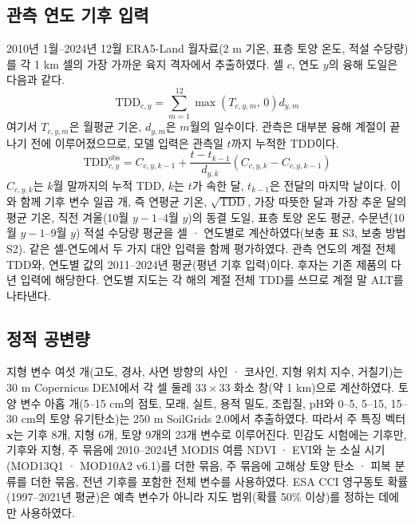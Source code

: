 \subsection{관측 연도 기후 입력}
2010년 1월--2024년 12월 ERA5-Land 월자료\cite{munozsabater2021_era5_land}(2 m 기온, 표층 토양 온도, 적설 수당량)를 각 1 km 셀의 가장 가까운 육지 격자에서 추출하였다. 셀 $c$, 연도 $y$의 융해 도일은 다음과 같다.
\begin{equation}
\mathrm{TDD}_{c,y} = \sum_{m=1}^{12} \max\!\left(T_{c,y,m},\,0\right) d_{y,m}
\label{eq:tdd}
\end{equation}
여기서 $T_{c,y,m}$은 월평균 기온, $d_{y,m}$은 $m$월의 일수이다. 관측은 대부분 융해 계절이 끝나기 전에 이루어졌으므로, 모델 입력은 관측일 $t$까지 누적한 TDD이다.
\begin{equation}
\mathrm{TDD}^{\mathrm{obs}}_{c,y} = C_{c,y,k-1} + \frac{t - t_{k-1}}{d_{y,k}} \left( C_{c,y,k} - C_{c,y,k-1} \right)
\label{eq:tddobs}
\end{equation}
$C_{c,y,k}$는 $k$월 말까지의 누적 TDD, $k$는 $t$가 속한 달, $t_{k-1}$은 전달의 마지막 날이다. 이와 함께 기후 변수 일곱 개, 즉 연평균 기온, $\sqrt{\mathrm{TDD}}$, 가장 따뜻한 달과 가장 추운 달의 평균 기온, 직전 겨울(10월 $y-1$--4월 $y$)의 동결 도일, 표층 토양 온도 평균, 수문년(10월 $y-1$--9월 $y$) 적설 수당량 평균을 셀 · 연도별로 계산하였다(보충 표 S3, 보충 방법 S2). 같은 셀-연도에서 두 가지 대안 입력을 함께 평가하였다. 관측 연도의 계절 전체 TDD와, 연도별 값의 2011--2024년 평균(평년 기후 입력)이다. 후자는 기존 제품의 다년 입력에 해당한다. 연도별 지도는 각 해의 계절 전체 TDD를 쓰므로 계절 말 ALT를 나타낸다.

\subsection{정적 공변량}
지형 변수 여섯 개(고도, 경사, 사면 방향의 사인 · 코사인, 지형 위치 지수, 거칠기)는 30 m Copernicus DEM\cite{CopDEM2021}에서 각 셀 둘레 $33\times33$ 화소 창(약 1 km)으로 계산하였다. 토양 변수 아홉 개(5--15 cm의 점토, 모래, 실트, 용적 밀도, 조립질, pH와 0--5, 5--15, 15--30 cm의 토양 유기탄소)는 250 m SoilGrids 2.0\cite{Poggio2021}에서 추출하였다. 따라서 주 특징 벡터 $\mathbf{x}$는 기후 8개, 지형 6개, 토양 9개의 23개 변수로 이루어진다. 민감도 시험에는 기후만, 기후와 지형, 주 묶음에 2010--2024년 MODIS 여름 NDVI · EVI와 눈 소실 시기(MOD13Q1 · MOD10A2 v6.1)\cite{Didan2021,HallRiggs2021}를 더한 묶음, 주 묶음에 고해상 토양 탄소 · 피복 분류\cite{Palmtag2022}를 더한 묶음, 전년 기후를 포함한 전체 변수를 사용하였다. ESA CCI 영구동토 확률(1997--2021년 평균)\cite{Westermann2024}은 예측 변수가 아니라 지도 범위(확률 50\% 이상)를 정하는 데에만 사용하였다.

